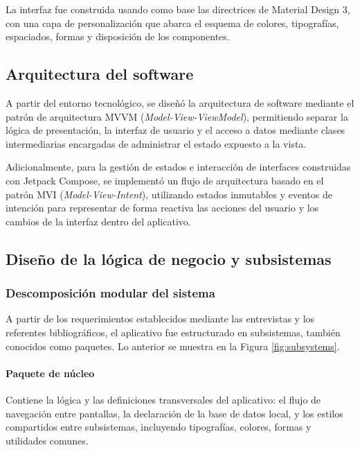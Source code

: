             La interfaz fue construida usando como base las directrices de Material Design 3, con una capa de personalización que abarca el esquema de colores, tipografías, espaciados, formas y disposición de los componentes.

    \subsection{Arquitectura del software}

        A partir del entorno tecnológico, se diseñó la arquitectura de software mediante el patrón de arquitectura MVVM (\textit{Model-View-ViewModel}), permitiendo separar la lógica de presentación, la interfaz de usuario y el acceso a datos mediante clases intermediarias encargadas de administrar el estado expuesto a la vista.
        
        Adicionalmente, para la gestión de estados e interacción de interfaces construidas con Jetpack Compose, se implementó un flujo de arquitectura basado en el patrón MVI (\textit{Model-View-Intent}), utilizando estados inmutables y eventos de intención para representar de forma reactiva las acciones del usuario y los cambios de la interfaz dentro del aplicativo.

    \subsection{Diseño de la lógica de negocio y subsistemas}

        \subsubsection{Descomposición modular del sistema}

        A partir de los requerimientos establecidos mediante las entrevistas y los referentes bibliográficos, el aplicativo fue estructurado en subsistemas, también conocidos como paquetes. Lo anterior se muestra en la Figura \ref{fig:subsystems}.

        

            \paragraph{Paquete de núcleo}

                Contiene la lógica y las definiciones transversales del aplicativo: el flujo de navegación entre pantallas, la declaración de la base de datos local, y los estilos compartidos entre subsistemas, incluyendo tipografías, colores, formas y utilidades comunes.

